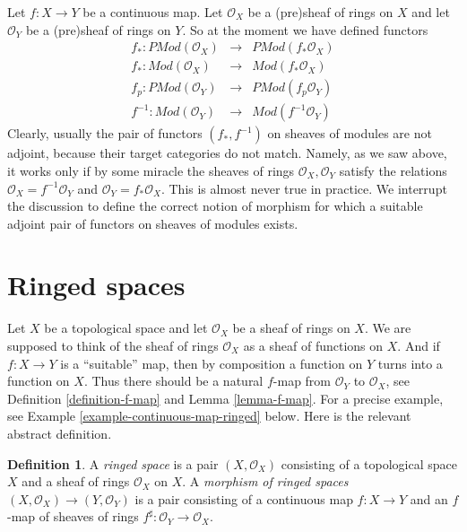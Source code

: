\documentclass{stacks-project}
\theoremstyle{plain}
\theoremstyle{definition}
\newtheorem{definition}[subsection]{Definition}
\theoremstyle{remark}
\numberwithin{equation}{subsection}
\begin{document}
\noindent
Let $f : X \to Y$ be a continuous map.
Let $\mathcal{O}_X$ be a (pre)sheaf of rings on $X$ and
let $\mathcal{O}_Y$ be a (pre)sheaf of rings on $Y$.
So at the moment we have defined functors
\begin{eqnarray*}
f_* : \textit{PMod}(\mathcal{O}_X) &
\longrightarrow &
\textit{PMod}(f_*\mathcal{O}_X) \\
f_* : \textit{Mod}(\mathcal{O}_X) &
\longrightarrow &
\textit{Mod}(f_*\mathcal{O}_X) \\
f_p : \textit{PMod}(\mathcal{O}_Y) &
\longrightarrow &
\textit{PMod}(f_p\mathcal{O}_Y) \\
f^{-1} : \textit{Mod}(\mathcal{O}_Y) &
\longrightarrow &
\textit{Mod}(f^{-1}\mathcal{O}_Y)
\end{eqnarray*}
Clearly, usually the pair of functors $(f_*, f^{-1})$
on sheaves of modules are not adjoint, because their target categories
do not match. Namely, as we saw above, it works only if by some miracle the
sheaves of rings $\mathcal{O}_X, \mathcal{O}_Y$ satisfy the
relations $\mathcal{O}_X = f^{-1}\mathcal{O}_Y$ and
$\mathcal{O}_Y = f_*\mathcal{O}_X$. This is almost never
true in practice. We interrupt the discussion to define
the correct notion of morphism for which a suitable adjoint
pair of functors on sheaves of modules exists.

\section{Ringed spaces}
\label{section-ringed-spaces}

\noindent
Let $X$ be a topological space and let $\mathcal{O}_X$
be a sheaf of rings on $X$. We are supposed to
think of the sheaf of rings $\mathcal{O}_X$ as a sheaf of functions
on $X$. And if $f : X \to Y$ is a ``suitable'' map, then by composition
a function on $Y$ turns into a function on $X$.
Thus there should be a natural
$f$-map from $\mathcal{O}_Y$ to $\mathcal{O}_X$,
see Definition \ref{definition-f-map} and
Lemma \ref{lemma-f-map}.
For a precise example, see
Example \ref{example-continuous-map-ringed} below. Here is the
relevant abstract definition.

\begin{definition}
\label{definition-ringed-space}
A {\it ringed space} is a pair $(X, \mathcal{O}_X)$ consisting
of a topological space $X$ and a sheaf of rings $\mathcal{O}_X$
on $X$. A {\it morphism of ringed spaces}
$(X, \mathcal{O}_X) \to (Y, \mathcal{O}_Y)$ is a pair
consisting of a continuous map $f : X \to Y$ and an
$f$-map of sheaves of rings
$f^\sharp : \mathcal{O}_Y \to \mathcal{O}_X$.
\end{definition}
\end{document}
